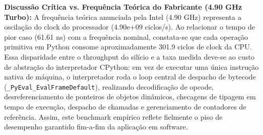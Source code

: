 \documentclass[10pt,a4paper]{article}
\begin{document}
\textbf{Discussão Crítica vs. Frequência Teórica do Fabricante (4.90 GHz Turbo):}
A frequência teórica anunciada pela Intel (4.90 GHz) representa a oscilação do clock do processador (4.90e+09 ciclos/s). Ao relacionar o tempo de pior caso (61.61 ns) com a frequência nominal, constata-se que cada operação primitiva em Python consome aproximadamente 301.9 ciclos de clock da CPU.
Essa disparidade entre o throughput do silício e a taxa medida deve-se ao custo de abstração do interpretador CPython: em vez de executar uma única instrução nativa de máquina, o interpretador roda o loop central de despacho de bytecode (\texttt{\_PyEval\_EvalFrameDefault}), realizando decodificação de opcode, desreferenciamento de ponteiros de objetos dinâmicos, checagens de tipagem em tempo de execução, despacho de chamadas e gerenciamento de contadores de referência. Assim, este benchmark empírico reflete fielmente o piso de desempenho garantido fim-a-fim da aplicação em software.
\end{document}
